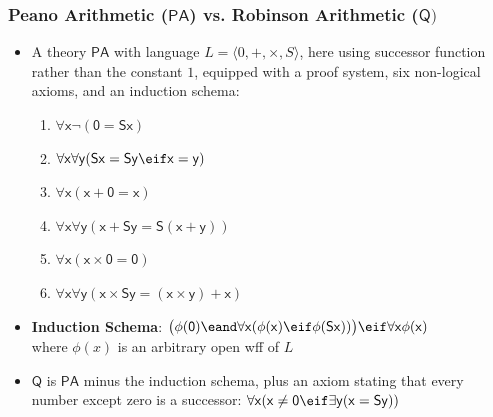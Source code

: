 \begin{frame}
\frametitle{Peano Arithmetic ($\mathsf{PA}$) vs. Robinson Arithmetic ($\mathsf{Q})$}

\begin{itemize}[<+->]

\item A theory $\mathsf{PA}$ with language $L=\langle 0, +, \times, S\rangle$, here using successor function rather than the constant $1$, equipped with a proof system, six non-logical axioms, and an induction schema:

\begin{enumerate}[1.)]

\item $\mathsf{\forall x \neg(0 = Sx)}$

\item $\mathsf{\forall x \forall y (Sx = Sy \eif x = y)}$

\item $\mathsf{\forall x (x + 0 = x)}$

\item $\mathsf{\forall x \forall y (x + Sy = S (x + y))}$

\item $\mathsf{\forall x (x \times 0 = 0)}$

\item $\mathsf{\forall x \forall y (x \times Sy = (x \times y) + x)}$

\end{enumerate}


\item[] \textbf{Induction Schema}: $\mathsf{\big (\phi(0) \eand \forall x (\phi(x) \eif \phi (Sx)) \big) \eif \forall x \phi (x)}$ \\ where $\phi(x)$ is an arbitrary open wff of $L$ 

\item $\mathsf{Q}$ is $\mathsf{PA}$ minus the induction schema, plus an axiom stating that every number except zero is a successor: $\mathsf{ \forall x (x \neq 0 \eif \exists y (x = Sy) ) }$





\end{itemize}
\end{frame}


